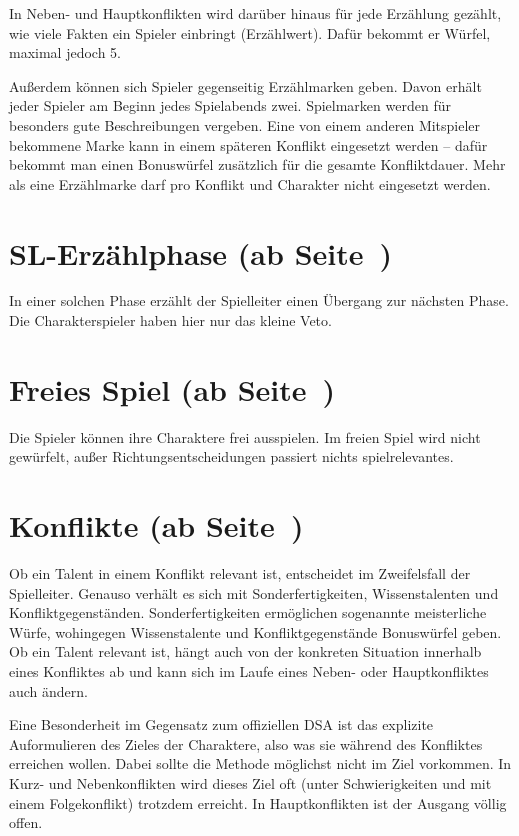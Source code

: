 In Neben- und Hauptkonflikten wird darüber hinaus für jede Erzählung gezählt, wie viele Fakten ein Spieler einbringt (Erzählwert). Dafür bekommt er Würfel, maximal jedoch 5. 

Außerdem können sich Spieler gegenseitig Erzählmarken geben. Davon erhält jeder Spieler am Beginn jedes Spielabends zwei. Spielmarken werden für besonders gute Beschreibungen vergeben. Eine von einem anderen Mitspieler bekommene Marke kann in einem späteren Konflikt eingesetzt werden -- dafür bekommt man einen Bonuswürfel zusätzlich für die gesamte Konfliktdauer. Mehr als eine Erzählmarke darf pro Konflikt und Charakter nicht eingesetzt werden.


\section[SL-Erzählphase]{SL-Erzählphase (ab Seite~\pageref{Ch:SLErzaehlphase})}
In einer solchen Phase erzählt der Spielleiter einen Übergang zur nächsten Phase. Die Charakterspieler haben hier nur das kleine Veto.


\section[Freies Spiel]{Freies Spiel (ab Seite~\pageref{Ch:FreiesSpiel})}
Die Spieler können ihre Charaktere frei ausspielen. Im freien Spiel wird nicht gewürfelt, außer Richtungsentscheidungen passiert nichts spielrelevantes.


\section[Konflikte]{Konflikte (ab Seite~\pageref{Ch:Konflikte})}
Ob ein Talent in einem Konflikt relevant ist, entscheidet im Zweifelsfall der Spielleiter. Genauso verhält es sich mit Sonderfertigkeiten, Wissenstalenten und Konfliktgegenständen. Sonderfertigkeiten ermöglichen sogenannte meisterliche Würfe, wohingegen Wissenstalente und Konfliktgegenstände Bonuswürfel geben. Ob ein Talent relevant ist, hängt auch von der konkreten Situation innerhalb eines Konfliktes ab und kann sich im Laufe eines Neben- oder Hauptkonfliktes auch ändern.

Eine Besonderheit im Gegensatz zum offiziellen DSA ist das explizite Auformulieren des Zieles der Charaktere, also was sie während des Konfliktes erreichen wollen. Dabei sollte die Methode möglichst nicht im Ziel vorkommen. In Kurz- und Nebenkonflikten wird dieses Ziel oft (unter Schwierigkeiten und mit einem Folgekonflikt) trotzdem erreicht. In Hauptkonflikten ist der Ausgang völlig offen.

